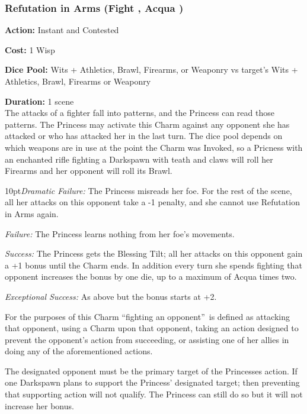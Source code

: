 \subsubsection*{Refutation in Arms (Fight \textbullet\textbullet\textbullet, Acqua \textbullet\textbullet)}

\noindent \textbf{Action:} Instant and Contested

\noindent \textbf{Cost:} 1 Wisp

\noindent \textbf{Dice Pool:} Wits + Athletics, Brawl, Firearms, or Weaponry vs target's Wits + Athletics, Brawl, Firearms or Weaponry

\noindent \textbf{Duration:} 1 scene\\

The attacks of a fighter fall into patterns, and the Princess can read those patterns. The Princess may activate this Charm against any opponent she has attacked or who has attacked her in the last turn. The dice pool depends on which weapons are in use at the point the Charm was Invoked, so a Pricness with an enchanted rifle fighting a Darkspawn with teath and claws will roll her Firearms and her opponent will roll its Brawl. 

\begin{myindentpar}{10pt}\emph{Dramatic Failure:} The Princess misreads her foe. For the rest of the scene, all her attacks on this opponent take a -1 penalty, and she cannot use Refutation in Arms again.

\emph{Failure:} The Princess learns nothing from her foe's movements.

\emph{Success:} The Princess gets the Blessing Tilt; all her attacks on this opponent gain a +1 bonus until the Charm ends. In addition every turn she spends fighting that opponent increases the bonus by one die, up to a maximum of Acqua times two. 

\emph{Exceptional Success:} As above but the bonus starts at +2.\end{myindentpar}

\noindent For the purposes of this Charm \textquotedblleft fighting an opponent\textquotedblright\, is defined as attacking that opponent, using a Charm upon that opponent, taking an action designed to prevent the opponent's action from succeeding, or assisting one of her allies in doing any of the aforementioned actions.

The designated opponent must be the primary target of the Princesses action. If one Darkspawn plans to support the Princess' designated target; then preventing that supporting action will not qualify. The Princess can still do so but it will not increase her bonus. 

